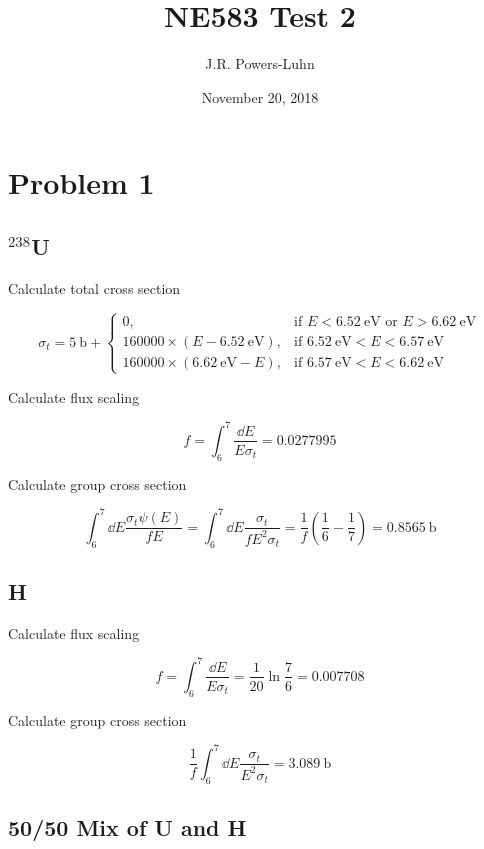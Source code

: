 \documentclass{article}
\title{NE583 Test 2}
\author{J.R. Powers-Luhn}
\date{November 20, 2018}
\begin{document}
\maketitle

\section{Problem 1}

\subsection{$^{238}$U}

Calculate total cross section

\[
\sigma_t = \SI{5}{\barn} + 
\begin{cases}
	0, & \text{if } E < \SI{6.52}{\electronvolt} \text{ or } E > \SI{6.62}{\electronvolt} \\
	160000 \times (E - \SI{6.52}{\electronvolt}), & \text{if } \SI{6.52}{\electronvolt} < E < \SI{6.57}{\electronvolt} \\
	160000 \times (\SI{6.62}{\electronvolt} - E), & \text{if } \SI{6.57}{\electronvolt} < E < \SI{6.62}{\electronvolt}
\end{cases}
\]

Calculate flux scaling

\[
f = \int_6^7 \frac{\dd{E}}{E \sigma_t} = 0.0277995
\]

Calculate group cross section

\[
	\int_6^7 \dd{E} \frac{\sigma_t \psi(E)}{f E} = \int_6^7 \dd{E} \frac{\sigma_t}{f E^2 \sigma_t} = \frac{1}{f}\left( \frac{1}{6} - \frac{1}{7}\right) = \SI{0.8565}{\barn}
\]

\subsection{H}

Calculate flux scaling

\[
f = \int_6^7 \frac{\dd{E}}{E \sigma_t} = \frac{1}{20} \ln \frac{7}{6} = 0.007708
\]

Calculate group cross section

\[
\frac{1}{f} \int_6^7 \dd{E} \frac{\sigma_t}{E^2 \sigma_t} = \SI{3.089}{\barn}
\]

\subsection{50/50 Mix of U and H}
\end{document}
